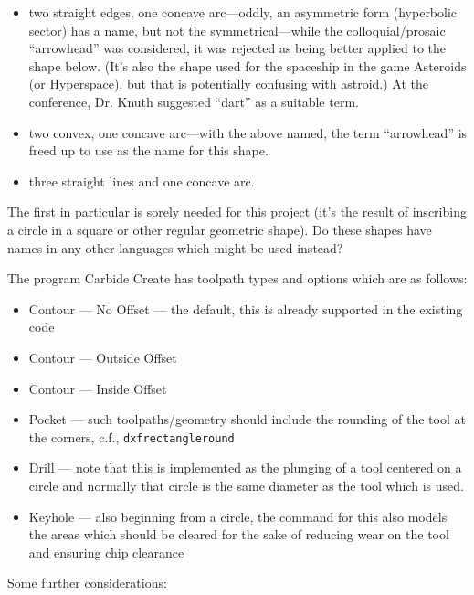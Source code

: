 \documentclass{ltxdoc}
\begin{document}
\begin{itemize}
 \item two straight edges, one concave arc---oddly, an asymmetric form (hyperbolic sector) has a name,
       but not the symmetrical---while the colloquial/prosaic “arrowhead” was considered, it was
       rejected as being better applied to the shape below. (It’s also the shape used for the
       spaceship in the game Asteroids (or Hyperspace), but that  is potentially confusing with
       astroid.) At the  conference, Dr. Knuth suggested “dart” as a suitable term.
 \item two convex, one concave arc---with the above named, the term “arrowhead” is freed up to use
       as the name for this shape.
 \item three straight lines and one concave arc.
 \end{itemize}

 The first in particular is sorely needed for this project (it’s the result of inscribing a circle in a square or other regular geometric shape). Do these shapes have names in any other languages which might be used instead?

The program Carbide Create has toolpath types and options which are as follows:

\begin{itemize}
 \item Contour --- No Offset --- the default, this is already supported in the existing code
 \item Contour --- Outside Offset
 \item Contour --- Inside Offset
 \item Pocket --- such toolpaths/geometry should include the rounding of the tool 
       at the corners, c.f., \verb|dxfrectangleround|
 \item Drill --- note that this is implemented as the plunging of a tool centered on a circle
                 and normally that circle is the same diameter as the tool which is used.
 \item Keyhole --- also beginning from a circle, the command for this also models the areas which
                   should be cleared for the sake of reducing wear
                   on the tool and ensuring chip clearance
\end{itemize}

 
Some further considerations:
\end{document}
